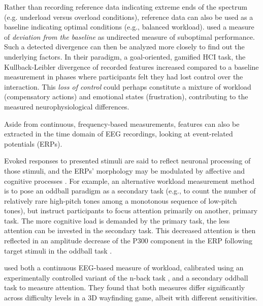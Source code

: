 Rather than recording reference data indicating extreme ends of the spectrum (e.g. underload versus overload conditions), reference data can also be used as a baseline indicating optimal conditions (e.g., balanced workload).  used a measure of \emph{deviation from the baseline} as undirected measure of suboptimal performance. Such a detected divergence can then be analyzed more closely to find out the underlying factors. In their paradigm, a goal-oriented, gamified HCI task, the Kullback-Leibler divergence of recorded features increased compared to a baseline measurement in phases where participants felt they had lost control over the interaction. This \emph{loss of control} could perhaps constitute a mixture of workload (compensatory actions) and emotional states (frustration), contributing to the measured neurophysiological differences.

Aside from continuous, frequency-based measurements, features can also be extracted in the time domain of EEG recordings, looking at event-related potentials (ERPs). 

Evoked responses to presented stimuli are said to reflect neuronal processing of those stimuli, and the ERPs' morphology may be modulated by affective and cognitive processes \cite{luck2014erp}. For example, an alternative workload measurement method is to pose an oddball paradigm as a secondary task (e.g., to count the number of relatively rare high-pitch tones among a monotonous sequence of low-pitch tones), but instruct participants to focus attention primarily on another, primary task. The more cognitive load is demanded by the primary task, the less attention can be invested in the secondary task. This decreased attention is then reflected in an amplitude decrease of the P300 component in the ERP following target stimuli in the oddball task \cite{kok2001p3workload}.

 used both a continuous EEG-based measure of workload, calibrated using an experimentally controlled variant of the n-back task \cite{kirchner1958nback}, and a secondary oddball task to measure attention. They found that both measures differ significantly across difficulty levels in a 3D wayfinding game, albeit with different sensitivities. 

